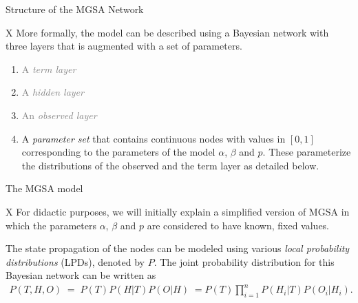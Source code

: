 \documentclass{beamer}
\begin{document}
\begin{frame}[fragile]{Structure of the MGSA Network}
 \begin{mybluebox}{X}
  More formally, the model can be described using a Bayesian network with three
layers that is augmented with a set of parameters.
 \end{mybluebox}
\begin{enumerate}
 \item \textcolor{gray}{A \emph{term layer}  }
 \item \textcolor{gray}{A \emph{hidden layer}}
 \item \textcolor{gray}{An \emph{observed layer} }
  \item A \emph{parameter set} that contains continuous nodes with values in
 $[0,1]$ corresponding to the parameters of the model $\alpha$, $\beta$ and
 $p$. These parameterize the distributions of the observed and the term layer
 as detailed below.
 
\end{enumerate}
\end{frame}
 
 
 \begin{frame}{The MGSA model}
  \begin{mybluebox}{X}
   For didactic purposes, we will initially explain a simplified version
of MGSA in which the parameters $\alpha$, $\beta$ and $p$ are considered to
have known, fixed values.
  \end{mybluebox}



The state propagation of the nodes can be modeled using various \emph{local
probability distributions} (LPDs), denoted by $P$. The joint probability
distribution for this Bayesian network can be written as
\begin{multline}
  P(T,H,O) \; = \; P(T)P(H|T)P(O|H)\;  = P(T)\prod_{i=1}^n
  P(H_i|T) P(O_i|H_i).
\label{eqn:joint.general}
\end{multline}
 \end{frame}
 
\end{document}
